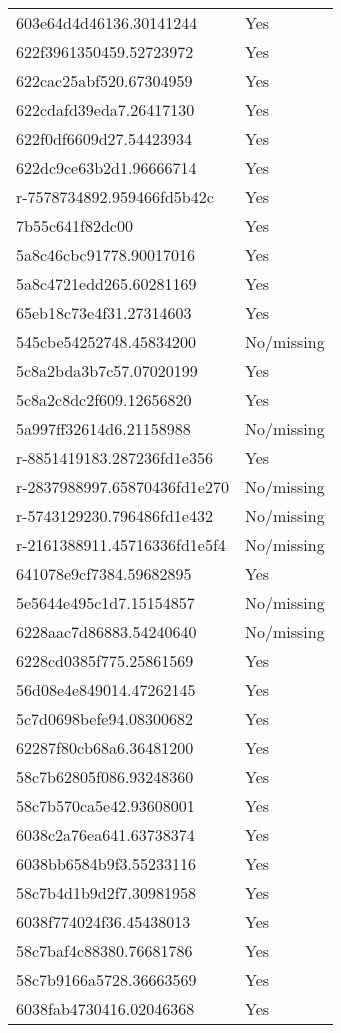 \begin{tabular}{ll}
603e64d4d46136.30141244 & Yes \\
622f3961350459.52723972 & Yes \\
622cac25abf520.67304959 & Yes \\
622cdafd39eda7.26417130 & Yes \\
622f0df6609d27.54423934 & Yes \\
622dc9ce63b2d1.96666714 & Yes \\
r-7578734892.959466fd5b42c & Yes \\
7b55c641f82dc00 & Yes \\
5a8c46cbc91778.90017016 & Yes \\
5a8c4721edd265.60281169 & Yes \\
65eb18c73e4f31.27314603 & Yes \\
545cbe54252748.45834200 & No/missing \\
5c8a2bda3b7c57.07020199 & Yes \\
5c8a2c8dc2f609.12656820 & Yes \\
5a997ff32614d6.21158988 & No/missing \\
r-8851419183.287236fd1e356 & Yes \\
r-2837988997.65870436fd1e270 & No/missing \\
r-5743129230.796486fd1e432 & No/missing \\
r-2161388911.45716336fd1e5f4 & No/missing \\
641078e9cf7384.59682895 & Yes \\
5e5644e495c1d7.15154857 & No/missing \\
6228aac7d86883.54240640 & No/missing \\
6228cd0385f775.25861569 & Yes \\
56d08e4e849014.47262145 & Yes \\
5c7d0698befe94.08300682 & Yes \\
62287f80cb68a6.36481200 & Yes \\
58c7b62805f086.93248360 & Yes \\
58c7b570ca5e42.93608001 & Yes \\
6038c2a76ea641.63738374 & Yes \\
6038bb6584b9f3.55233116 & Yes \\
58c7b4d1b9d2f7.30981958 & Yes \\
6038f774024f36.45438013 & Yes \\
58c7baf4c88380.76681786 & Yes \\
58c7b9166a5728.36663569 & Yes \\
6038fab4730416.02046368 & Yes \\

\end{tabular}

